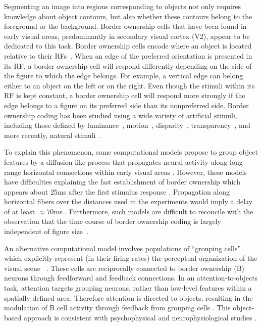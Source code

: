 Segmenting an image into regions corresponding to objects not only requires knowledge about object contours, but also whether these contours belong to the foreground or the background. Border ownership cells that have been found in early visual areas, predominantly in secondary visual cortex (V2), appear to be dedicated to this task. Border ownership cells encode where an object is located relative to their RFs~\citep{Zhou_etal00}. When an edge of the preferred orientation is presented in its RF, a border ownership cell will respond differently depending on the side of the figure to which the edge belongs. For example, a vertical edge can belong either to an object on the left or on the right. Even though the stimuli within its RF is kept constant, a border ownership cell will respond more strongly if the edge belongs to a figure on its preferred side than its nonpreferred side. Border ownership coding has been studied using a wide variety of artificial stimuli, including those defined by luminance~\citep{Zhou_etal00}, motion~\citep{vonderHeydt_etal03a}, disparity~\citep{Qiu_vonderHeydt05}, transparency~\citep{Qiu_vonderHeydt07}, and more recently, natural stimuli~\citep{Williford_vonderHeydt14}.

To explain this phenomenon, some computational models propose to group object features by a diffusion-like process that propagates neural activity along long-range horizontal connections within early visual areas \citep{Grossberg94, Sajda_Finkel95, Zhaoping05}. However, these models have difficulties explaining the fast establishment of border ownership which appears about 25ms after the first stimulus response \citep{Zhou_etal00}. Propagation along horizontal fibers over the distances used in the experiments would imply a delay of at least $\approx 70$ms \citep[][calculations based on the conduction velocity of horizontal fibers in primate V1 cortex, we are not aware of corresponding data for V2]{Girard_etal01}. Furthermore, such models are difficult to reconcile with the observation that the time course of border ownership coding is largely independent of figure size~\citep{Sugihara_etal11}.

An alternative computational model involves populations of ``grouping cells'' which explicitly represent (in their firing rates) the perceptual organization of the visual scene ~\citep{Craft_etal07}.  These cells are reciprocally connected to border ownership (B) neurons
through feedforward and feedback connections. In an attention-to-objects task, attention targets grouping neurons, rather
than low-level features within a spatially-defined area. Therefore
attention is directed to objects, resulting in the modulation of B cell activity through feedback from grouping cells \citep{Mihalas_etal11b}.  This object-based approach is consistent with psychophysical and
neurophysiological studies \citep[\eg][]{Duncan84,Egly_etal94,Scholl01,Kimchi_etal07,Qiu_etal07,Ho_Yeh09,Poort_etal12}.

